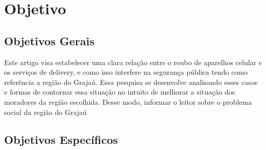 \section{Objetivo}

    \subsection{Objetivos Gerais}

        Este artigo visa estabelecer uma clara relação entre o roubo de aparelhos 
        celular e os serviços de delivery, e como isso interfere na segurança pública
        tendo como referência a região do Grajaú. Essa pesquisa se desenvolve analisando
        esses casos e formas de contornar  essa situação no intuito de melhorar a 
        situação dos moradores da região  escolhida. Desse modo, informar o leitor 
        sobre o problema social da região do Grajaú  


    \subsection{Objetivos Específicos}